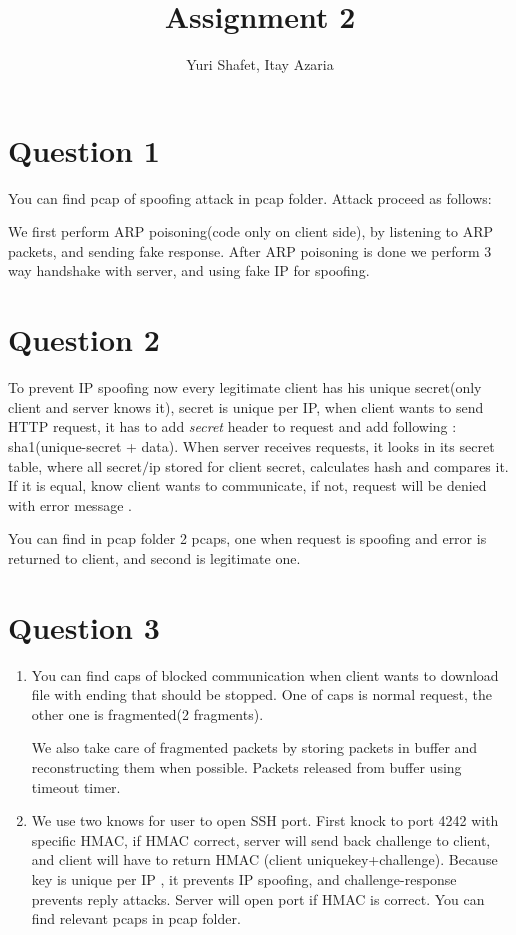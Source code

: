 \documentclass{report}
\begin{document}
\author{Yuri Shafet, Itay Azaria}
\title{Assignment 2}
\maketitle

\section*{Question 1}
You can find pcap of spoofing attack in pcap folder.
Attack proceed as follows:

We first perform ARP poisoning(code only on client side), by listening to ARP packets, and sending fake response. After ARP poisoning is done we perform 3 way handshake with server, and using fake IP for spoofing.

\section*{Question 2}

To prevent IP spoofing now every legitimate client has his unique secret(only client and server knows it), secret is unique per IP, when client wants to send HTTP request, it has to add \emph{secret} header to request and add following : sha1(unique-secret + data). When server receives requests, it looks in its secret table, where all secret$/$ip stored for client secret,  calculates hash and compares it. If it is equal, know client wants to communicate, if not, request will be denied with error message .

You can find in pcap folder 2 pcaps, one when request is spoofing and error is returned to client, and second is legitimate one.

\section*{Question 3}
\begin{enumerate}
\item 
	You can find caps of blocked communication when client wants to download file with ending that should be stopped. One of caps is normal request, the other one is fragmented(2 fragments).
	
	We also take care of fragmented packets by storing packets in buffer and reconstructing them when possible. Packets released from buffer using timeout timer.

\item
	We use two knows for user to open SSH port. First knock to port 4242 with specific HMAC, if HMAC correct, server will send back challenge to client, and client will have to return HMAC (client uniquekey+challenge). Because key is unique per IP , it prevents IP spoofing, and challenge-response prevents reply attacks. Server will open port if HMAC is correct. You can find relevant pcaps in pcap folder. 
	


\end{enumerate}
\end{document}
